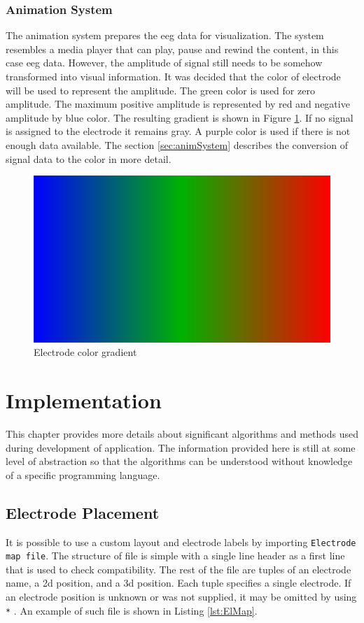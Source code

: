 \subsection{Animation System}
\label{ssec:concAnimSystem}
The animation system prepares the \gls{eeg} data for visualization. The system resembles a media player that can play, pause and rewind the content, in this case \gls{eeg} data. However, the amplitude of signal still needs to be somehow transformed into visual information. It was decided that the color of electrode will be used to represent the amplitude. The green color is used for zero amplitude. The maximum positive amplitude is represented by red and negative amplitude by blue color. The resulting gradient is shown in Figure \ref{fig:ElColorGradient}. If no signal is assigned to the electrode it remains gray. A purple color is used if there is not enough data available. The section \ref{sec:animSystem} describes the conversion of signal data to the color in more detail.

\begin{figure}[htb]
	\centering
	\includegraphics[width=0.8\linewidth, height=0.05\textheight]{fig/gradient.pdf}
	\caption{Electrode color gradient}
	\label{fig:ElColorGradient}
\end{figure}

\chapter{Implementation}
\label{implementation}
This chapter provides more details about significant algorithms and methods used during  development of application. The information provided here is still at some level of abstraction 
so that the algorithms can be understood without knowledge of a specific programming language.

\section{Electrode Placement}
\label{sec:implElPlacement}
It is possible to use a custom layout and electrode labels by importing \texttt{Electrode map file}. The structure of file is simple with a single line header as a first line that is used to check compatibility. The rest of the file are tuples of an electrode name, a \gls{2d} position, and a \gls{3d} position. Each tuple specifies a single electrode. If an electrode position is unknown or was not supplied, it may be omitted by using \texttt{*} . An example of such file is shown in Listing \ref{lst:ElMap}.

